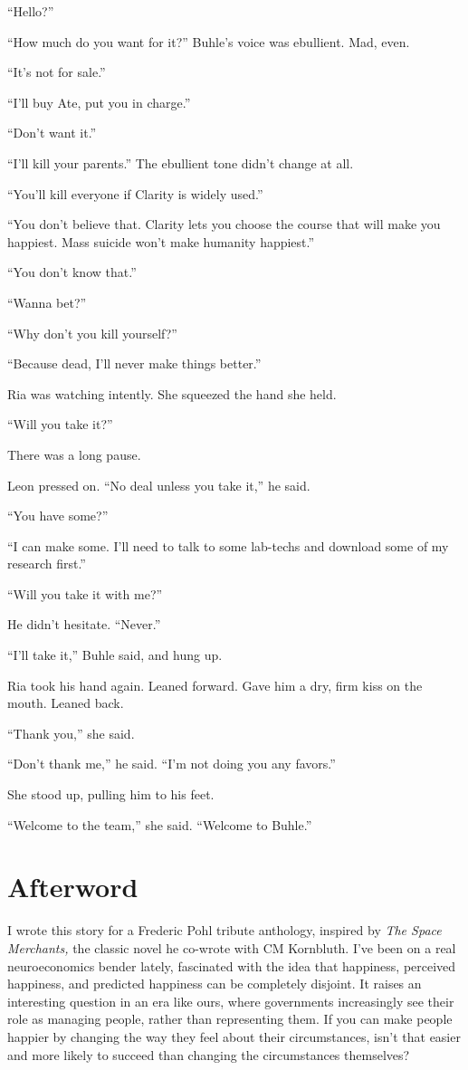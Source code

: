 “Hello?”

“How much do you want for it?” Buhle's voice was ebullient. Mad, 
even.

“It's not for sale.”

“I'll buy Ate, put you in charge.”

“Don't want it.”

“I'll kill your parents.” The ebullient tone didn't change at all.

“You'll kill everyone if Clarity is widely used.”

“You don't believe that. Clarity lets you choose the course that will 
make you happiest. Mass suicide won't make humanity happiest.”

“You don't know that.”

“Wanna bet?”

“Why don't you kill yourself?”

“Because dead, I'll never make things better.”

Ria was watching intently. She squeezed the hand she held.

“Will you take it?”

There was a long pause.

Leon pressed on. “No deal unless you take it,” he said.

“You have some?”

“I can make some. I'll need to talk to some lab-techs and download 
some of my research first.”

“Will you take it with me?”

He didn't hesitate. “Never.”

“I'll take it,” Buhle said, and hung up.

Ria took his hand again. Leaned forward. Gave him a dry, firm kiss on 
the mouth. Leaned back.

“Thank you,” she said.

“Don't thank me,” he said. “I'm not doing you any favors.”

She stood up, pulling him to his feet.

“Welcome to the team,” she said. “Welcome to Buhle.”

\section{Afterword}

I wrote this story for a Frederic Pohl tribute anthology, inspired by 
\emph{The Space Merchants,} the classic novel he co-wrote with CM 
Kornbluth. I've been on a real neuroeconomics bender lately, fascinated 
with the idea that happiness, perceived happiness, and predicted 
happiness can be completely disjoint. It raises an interesting question 
in an era like ours, where governments increasingly see their role as 
managing people, rather than representing them. If you can make people 
happier by changing the way they feel about their circumstances, isn't 
that easier and more likely to succeed than changing the circumstances 
themselves?

